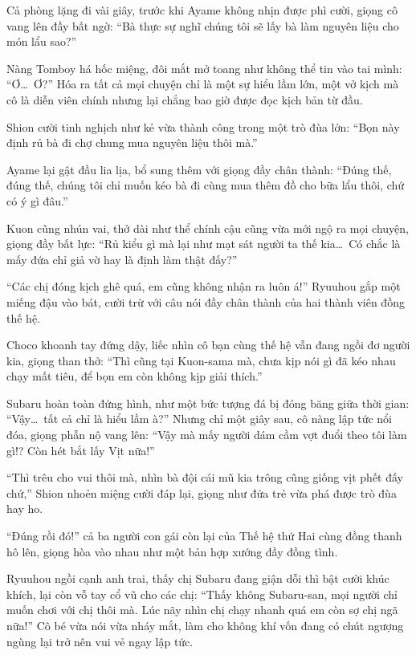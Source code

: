 \documentclass[../main.tex]{subfiles}
\begin{document}
Cả phòng lặng đi vài giây, trước khi Ayame không nhịn được phì cười, giọng cô vang lên đầy bất ngờ: ``Bà thực sự nghĩ chúng tôi sẽ lấy bà làm nguyên liệu cho món lẩu sao?''

Nàng Tomboy há hốc miệng, đôi mắt mở toang như không thể tin vào tai mình: ``Ơ\dots\ Ơ?'' Hóa ra tất cả mọi chuyện chỉ là một sự hiểu lầm lớn, một vở kịch mà cô là diễn viên chính nhưng lại chẳng bao giờ được đọc kịch bản từ đầu.

Shion cười tinh nghịch như kẻ vừa thành công trong một trò đùa lớn: ``Bọn này định rủ bà đi chợ chung mua nguyên liệu thôi mà.''

Ayame lại gật đầu lia lịa, bổ sung thêm với giọng đầy chân thành: ``Đúng thế, đúng thế, chúng tôi chỉ muốn kéo bà đi cùng mua thêm đồ cho bữa lẩu thôi, chứ có ý gì đâu.''

Kuon cũng nhún vai, thở dài như thể chính cậu cũng vừa mới ngộ ra mọi chuyện, giọng đầy bất lực: ``Rủ kiểu gì mà lại như mạt sát người ta thế kia\dots\ Có chắc là mấy đứa chỉ giả vờ hay là định làm thật đấy?''

``Các chị đóng kịch ghê quá, em cũng không nhận ra luôn á!'' Ryuuhou gắp một miếng đậu vào bát, cười trừ với câu nói đầy chân thành của hai thành viên đồng thế hệ.

Choco khoanh tay đứng dậy, liếc nhìn cô bạn cùng thế hệ vẫn đang ngồi đơ người kia, giọng than thở: ``Thì cũng tại Kuon-sama mà, chưa kịp nói gì đã kéo nhau chạy mất tiêu, để bọn em còn không kịp giải thích.''

Subaru hoàn toàn đứng hình, như một bức tượng đá bị đóng băng giữa thời gian: ``Vậy\dots\ tất cả chỉ là hiểu lầm à?'' Nhưng chỉ một giây sau, cô nàng lập tức nổi đóa, giọng phẫn nộ vang lên: ``Vậy mà mấy người dám cầm vợt đuổi theo tôi làm gì!? Còn hét bắt lấy Vịt nữa!''

``Thì trêu cho vui thôi mà, nhìn bà đội cái mũ kia trông cũng giống vịt phết đấy chứ,'' Shion nhoẻn miệng cười đáp lại, giọng như đứa trẻ vừa phá được trò đùa hay ho.

``Đúng rồi đó!'' cả ba người con gái còn lại của Thế hệ thứ Hai cùng đồng thanh hô lên, giọng hòa vào nhau như một bản hợp xướng đầy đồng tình.

Ryuuhou ngồi cạnh anh trai, thấy chị Subaru đang giận dỗi thì bật cười khúc khích, lại còn vỗ tay cổ vũ cho các chị: ``Thấy không Subaru-san, mọi người chỉ muốn chơi với chị thôi mà. Lúc nãy nhìn chị chạy nhanh quá em còn sợ chị ngã nữa!'' Cô bé vừa nói vừa nháy mắt, làm cho không khí vốn đang có chút ngượng ngùng lại trở nên vui vẻ ngay lập tức.
\end{document}
